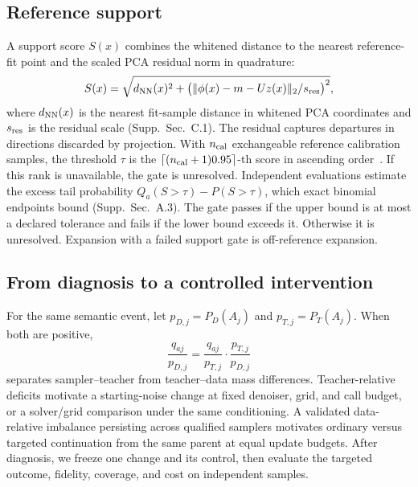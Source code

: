 \subsection{Reference support}
\label{sec:support}
A support score $S(x)$ combines the whitened distance to the nearest
reference-fit point and the scaled PCA residual norm in quadrature:
\begin{equation}
S(x)=\sqrt{d_{\rm NN}(x)^2+
\bigl(\|\phi(x)-m-Uz(x)\|_2/s_{\rm res}\bigr)^2},
\label{eq:support}
\end{equation}
where $d_{\rm NN}(x)$ is the nearest fit-sample distance in whitened PCA
coordinates and $s_{\rm res}$ is the residual scale (Supp.~Sec.~C.1).
The residual captures departures in directions discarded by projection.
With $n_{\rm cal}$ exchangeable reference calibration samples, the
threshold $\tau$ is the $\lceil(n_{\rm cal}+1)0.95\rceil$-th score in
ascending order~\cite{vovk2013conditional}. If this rank is unavailable,
the gate is unresolved. Independent evaluations estimate the excess tail
probability $Q_a(S>\tau)-P(S>\tau)$, which exact binomial endpoints bound
(Supp.~Sec.~A.3). The gate passes if the upper bound is at most a declared
tolerance and fails if the lower bound exceeds it. Otherwise it is
unresolved. Expansion with a failed support gate is off-reference expansion.

\subsection{From diagnosis to a controlled intervention}
\label{sec:intervene}
For the same semantic event, let $p_{D,j}=P_D(A_j)$ and $p_{T,j}=P_T(A_j)$.
When both are positive,
\begin{equation}
\frac{q_{aj}}{p_{D,j}}=\frac{q_{aj}}{p_{T,j}}\cdot\frac{p_{T,j}}{p_{D,j}}
\label{eq:decomp}
\end{equation}
separates sampler--teacher from teacher--data mass differences.
Teacher-relative deficits motivate a starting-noise change at fixed
denoiser, grid, and call budget, or a solver/grid comparison under the
same conditioning. A validated data-relative imbalance persisting across
qualified samplers motivates ordinary versus targeted continuation from
the same parent at equal update budgets. After diagnosis, we freeze one
change and its control, then evaluate the targeted outcome, fidelity,
coverage, and cost on independent samples.

